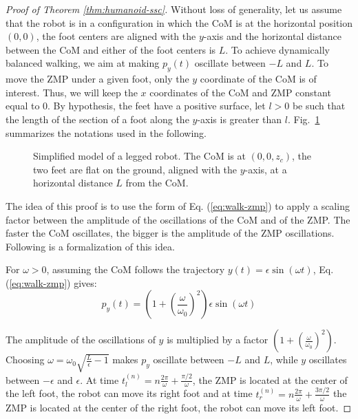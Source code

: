 \documentclass{article}
\begin{document}
\begin{proof}[Proof of Theorem \ref{thm:humanoid-ssc}]
Without loss of generality, let us assume that the robot is in a configuration
in which the CoM is at the horizontal position $(0,0)$, the foot centers  are 
aligned with the $y$-axis and the horizontal distance between the CoM and either of the foot centers
is $L$. To achieve dynamically balanced walking, we aim at making
$p_y(t)$ oscillate  between $-L$ and $L$. To move the ZMP  under a
given foot, only  the $y$ coordinate of the CoM  is of interest. Thus,
we will keep the $x$ coordinates  of the CoM and ZMP constant equal to
$0$. By hypothesis, the feet have a positive surface,
let $l>0$ be such that the length of the section of a foot along the 
$y$-axis is greater than $l$. Fig.~\ref{fig:simple-humanoid} summarizes the notations used
in the following.

\begin{figure}[h]
  \centering
  

  \caption{Simplified model of a legged robot. The CoM is at $(0,0,z_c)$, the two feet 
    are flat on the ground, aligned with the $y$-axis, at a horizontal distance $L$ 
    from the CoM.}
  \label{fig:simple-humanoid}
\end{figure}


The idea of this proof is to use the form of Eq. (\ref{eq:walk-zmp}) to
apply a  scaling factor between  the amplitude of the  oscillations of
the CoM and of the ZMP. The faster the CoM oscillates, the bigger is the amplitude
of the ZMP oscillations. Following is a formalization of this  idea.

For $\omega >0$, assuming the CoM follows the trajectory
$y(t) = \epsilon \sin(\omega t)$,  Eq. (\ref{eq:walk-zmp}) gives:
\[
p_y(t) =
(1+\left(\frac{\omega}{\omega_0}\right)^2)\epsilon\sin(\omega t)
\]

The
amplitude  of  the oscillations  of  $y$  is  multiplied by  a  factor
$(1+\left(\frac{\omega}{\omega_0}\right)^2)$.  Choosing  $\omega =
\omega_0 \sqrt{\frac{L}{\epsilon} -1}$ makes  $p_y$ oscillate between $-L$
and    $L$, while $y$ oscillates between $-\epsilon$ and $\epsilon$.   
At    time   $t_l^{(n)}    =    n\frac{2\pi}{\omega}   +
\frac{\pi/2}{\omega}$, the  ZMP is located  at the center of  the left
foot,  the robot  can move  its right  foot and  at time  $t_r^{(n)} =
n\frac{2\pi}{\omega}  + \frac{3\pi/2}{\omega}$ the  ZMP is  located at
the center of the right foot, the robot can move its left foot.


\end{proof}
\end{document}
